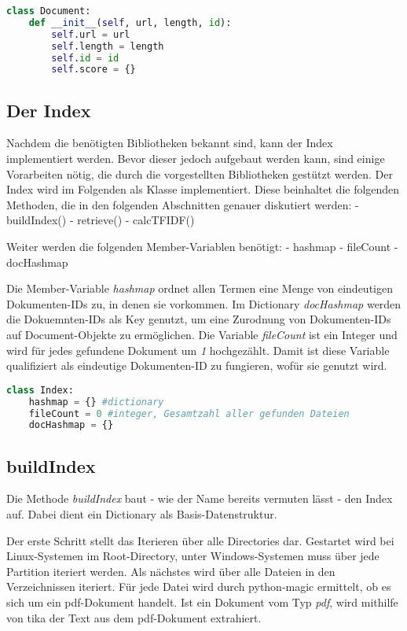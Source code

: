 \begin{lstlisting}[language=Python]
class Document:
    def __init__(self, url, length, id):
        self.url = url
        self.length = length
        self.id = id
        self.score = {}
\end{lstlisting}

\subsection{Der Index}\label{der-index}

Nachdem die benötigten Bibliotheken bekannt sind, kann der Index
implementiert werden. Bevor dieser jedoch aufgebaut werden kann, sind
einige Vorarbeiten nötig, die durch die vorgestellten Bibliotheken
gestützt werden. Der Index wird im Folgenden als Klasse implementiert.
Diese beinhaltet die folgenden Methoden, die in den folgenden
Abschnitten genauer diskutiert werden: - buildIndex() - retrieve() -
calcTFIDF()

Weiter werden die folgenden Member-Variablen benötigt: - hashmap -
fileCount - docHashmap

Die Member-Variable \emph{hashmap} ordnet allen Termen eine Menge von
eindeutigen Dokumenten-IDs zu, in denen sie vorkommen. Im Dictionary
\emph{docHashmap} werden die Dokuemnten-IDs als Key genutzt, um eine
Zurodnung von Dokumenten-IDs auf Document-Objekte zu ermöglichen. Die
Variable \emph{fileCount} ist ein Integer und wird für jedes gefundene
Dokument um \emph{1} hochgezählt. Damit ist diese Variable qualifiziert
als eindeutige Dokumenten-ID zu fungieren, wofür sie genutzt wird.

\begin{lstlisting}[language=Python]
class Index:
    hashmap = {} #dictionary
    fileCount = 0 #integer, Gesamtzahl aller gefunden Dateien
    docHashmap = {}
\end{lstlisting}

\subsection{buildIndex}\label{buildindex}

Die Methode \emph{buildIndex} baut - wie der Name bereits vermuten lässt
- den Index auf. Dabei dient ein Dictionary als Basis-Datenstruktur.

Der erste Schritt stellt das Iterieren über alle Directories dar.
Gestartet wird bei Linux-Systemen im Root-Directory, unter
Windows-Systemen muss über jede Partition iteriert werden. Als nächstes
wird über alle Dateien in den Verzeichnissen iteriert. Für jede Datei
wird durch python-magic ermittelt, ob es sich um ein pdf-Dokument
handelt. Ist ein Dokument vom Typ \emph{pdf}, wird mithilfe von tika der
Text aus dem pdf-Dokument extrahiert.

